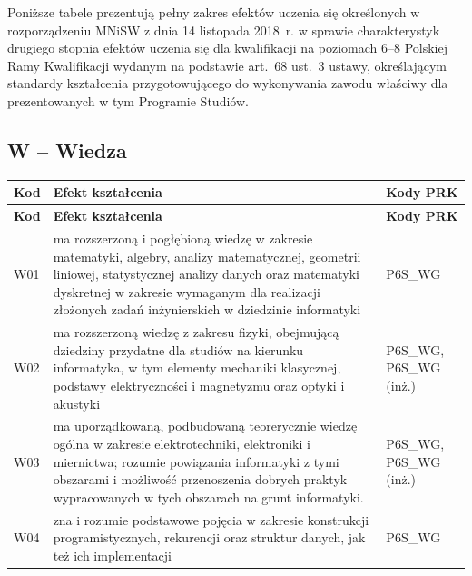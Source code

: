 \documentclass[12pt,a4paper]{article}
\newcommand{\thdrule}{\noalign{\global\setlength{\extrarowheight}{0pt}}}
\newcommand{\thdend}{\noalign{\global\setlength{\extrarowheight}{4pt}}}
\begin{document}
Poniższe tabele prezentują pełny zakres efektów uczenia się określonych w rozporządzeniu MNiSW z dnia 14 listopada 2018~r. w sprawie charakterystyk drugiego stopnia efektów uczenia się dla kwalifikacji na poziomach 6--8 Polskiej Ramy Kwalifikacji wydanym na podstawie art.~68 ust.~3 ustawy, określającym standardy kształcenia przygotowującego do wykonywania zawodu właściwy dla prezentowanych w tym Programie Studiów.

\subsection*{W -- Wiedza}

{\scriptsize
\begin{longtable}{m{1cm}m{9.5cm}m{3.9cm}}
\thdrule\toprule
\rowcolor{pjatkRed} {\color{white}\footnotesize\textbf{\vphantom{Ag}Kod}} & {\color{white}\footnotesize\textbf{\vphantom{Ag}Efekt kształcenia}} & {\color{white}\footnotesize\textbf{\vphantom{Ag}Kody PRK}} \\
\midrule\thdend
\endfirsthead
\thdrule\toprule
\rowcolor{pjatkRed} {\color{white}\footnotesize\textbf{\vphantom{Ag}Kod}} & {\color{white}\footnotesize\textbf{\vphantom{Ag}Efekt kształcenia}} & {\color{white}\footnotesize\textbf{\vphantom{Ag}Kody PRK}} \\
\midrule\thdend
\endhead
\rowcolor{tableRowLight} W01 & ma rozszerzoną i pogłębioną wiedzę  w zakresie matematyki, algebry, analizy matematycznej, geometrii liniowej, statystycznej analizy danych oraz matematyki dyskretnej w zakresie wymaganym dla realizacji złożonych zadań inżynierskich w dziedzinie informatyki & {\scriptsize P6S\_WG} \\
\rowcolor{tableRowAlt} W02 & ma rozszerzoną wiedzę  z zakresu fizyki, obejmującą dziedziny przydatne dla studiów na kierunku informatyka, w tym elementy mechaniki klasycznej, podstawy elektryczności i magnetyzmu oraz optyki i akustyki & {\scriptsize P6S\_WG, P6S\_WG {\scriptsize (inż.)}} \\
\rowcolor{tableRowLight} W03 & ma uporządkowaną, podbudowaną teorerycznie wiedzę ogólna w zakresie elektrotechniki, elektroniki i miernictwa; rozumie powiązania informatyki z tymi obszarami i możliwość przenoszenia dobrych praktyk wypracowanych w tych obszarach na grunt informatyki. & {\scriptsize P6S\_WG, P6S\_WG {\scriptsize (inż.)}} \\
\rowcolor{tableRowAlt} W04 & zna i rozumie podstawowe pojęcia w zakresie konstrukcji programistycznych, rekurencji oraz struktur danych, jak też ich  implementacji & {\scriptsize P6S\_WG} \\

\end{longtable}}
\end{document}
